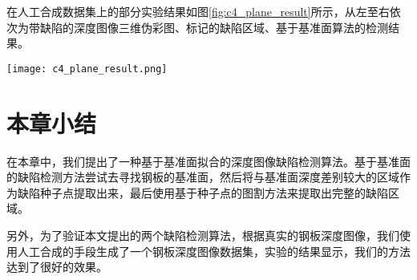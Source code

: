         在人工合成数据集上的部分实验结果如图\ref{fig:c4_plane_result}所示，从左至右依次为带缺陷的深度图像三维伪彩图、标记的缺陷区域、基于基准面算法的检测结果。

        \begin{figure*}[!h]
        \centering
        \texttt{[image: c4\_plane\_result.png]}
        \caption{基于基准面拟合方法的部分实验结果}
        \label{fig:c4_plane_result}
        \end{figure*}

    \section{本章小结}
    在本章中，我们提出了一种基于基准面拟合的深度图像缺陷检测算法。基于基准面的缺陷检测方法尝试去寻找钢板的基准面，然后将与基准面深度差别较大的区域作为缺陷种子点提取出来，最后使用基于种子点的图割方法来提取出完整的缺陷区域。

    另外，为了验证本文提出的两个缺陷检测算法，根据真实的钢板深度图像，我们使用人工合成的手段生成了一个钢板深度图像数据集，实验的结果显示，我们的方法达到了很好的效果。

